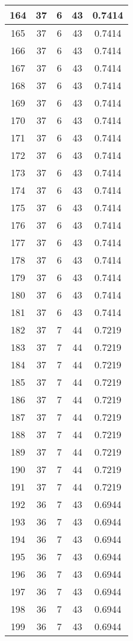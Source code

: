 \documentclass[letterpaper, 12pt]{article}
\begin{document}
\begin{longtable}{|c|c|c|c|c|}
\hline
164 & 37 & 6 & 43 & 0.7414 \\
\hline
165 & 37 & 6 & 43 & 0.7414 \\
\hline
166 & 37 & 6 & 43 & 0.7414 \\
\hline
167 & 37 & 6 & 43 & 0.7414 \\
\hline
168 & 37 & 6 & 43 & 0.7414 \\
\hline
169 & 37 & 6 & 43 & 0.7414 \\
\hline
170 & 37 & 6 & 43 & 0.7414 \\
\hline
171 & 37 & 6 & 43 & 0.7414 \\
\hline
172 & 37 & 6 & 43 & 0.7414 \\
\hline
173 & 37 & 6 & 43 & 0.7414 \\
\hline
174 & 37 & 6 & 43 & 0.7414 \\
\hline
175 & 37 & 6 & 43 & 0.7414 \\
\hline
176 & 37 & 6 & 43 & 0.7414 \\
\hline
177 & 37 & 6 & 43 & 0.7414 \\
\hline
178 & 37 & 6 & 43 & 0.7414 \\
\hline
179 & 37 & 6 & 43 & 0.7414 \\
\hline
180 & 37 & 6 & 43 & 0.7414 \\
\hline
181 & 37 & 6 & 43 & 0.7414 \\
\hline
182 & 37 & 7 & 44 & 0.7219 \\
\hline
183 & 37 & 7 & 44 & 0.7219 \\
\hline
184 & 37 & 7 & 44 & 0.7219 \\
\hline
185 & 37 & 7 & 44 & 0.7219 \\
\hline
186 & 37 & 7 & 44 & 0.7219 \\
\hline
187 & 37 & 7 & 44 & 0.7219 \\
\hline
188 & 37 & 7 & 44 & 0.7219 \\
\hline
189 & 37 & 7 & 44 & 0.7219 \\
\hline
190 & 37 & 7 & 44 & 0.7219 \\
\hline
191 & 37 & 7 & 44 & 0.7219 \\
\hline
192 & 36 & 7 & 43 & 0.6944 \\
\hline
193 & 36 & 7 & 43 & 0.6944 \\
\hline
194 & 36 & 7 & 43 & 0.6944 \\
\hline
195 & 36 & 7 & 43 & 0.6944 \\
\hline
196 & 36 & 7 & 43 & 0.6944 \\
\hline
197 & 36 & 7 & 43 & 0.6944 \\
\hline
198 & 36 & 7 & 43 & 0.6944 \\
\hline
199 & 36 & 7 & 43 & 0.6944 \\
\hline
\end{longtable}
\end{document}
